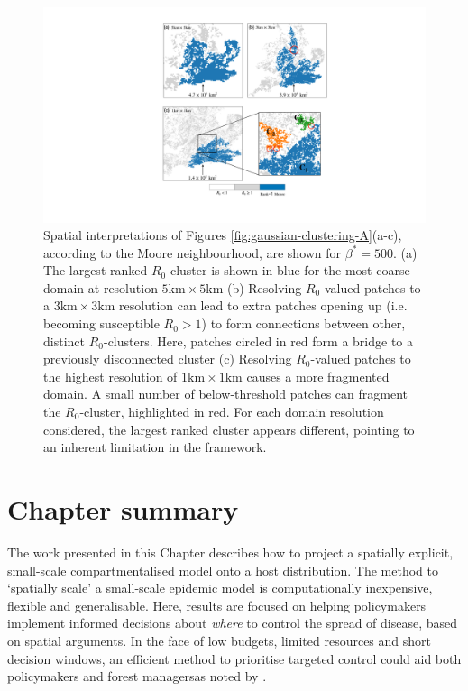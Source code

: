 \begin{figure}
    \centering
    \includegraphics[scale=0.55]{chapter6/figures/fig6B-ga-cluster-distribution.pdf}
    \caption{ 
     Spatial interpretations of Figures \ref{fig:gaussian-clustering-A}(a-c), according to the Moore neighbourhood, are shown for $\beta^*=500$. 
    (a) The largest ranked $R_0$-cluster is shown in blue for the most coarse domain at resolution $\mathrm{5km \times 5km}$ 
    (b) Resolving $R_0$-valued patches to a $\mathrm{3km \times 3km}$ resolution can lead to extra patches opening up 
    (i.e. becoming susceptible $R_0 > 1$) to form connections between other, distinct $R_0$-clusters. 
    Here, patches circled in red form a bridge to a previously disconnected cluster 
    (c) Resolving $R_0$-valued patches to the highest resolution of $\mathrm{1km \times 1km}$ causes a more fragmented domain. 
    A small number of below-threshold patches can fragment the $R_0$-cluster, highlighted in red.
    For each domain resolution considered, the largest ranked cluster appears different, pointing to an inherent limitation in the framework.
    }
    \label{fig:gaussian-clustering-B}
\end{figure}

\section{Chapter summary}

The work presented in this Chapter describes how to project a spatially explicit, small-scale compartmentalised model onto a host distribution.
The method to `spatially scale' a small-scale epidemic model is computationally inexpensive, flexible and generalisable.
Here, results are focused on helping policymakers implement informed decisions about \textit{where} to control the spread of disease, based on spatial arguments.
In the face of low budgets, limited resources and short decision windows, an efficient method to prioritise targeted control could aid both policymakers and forest managers\textemdash as noted by \cite{13-challenges, time-varying-infectivity}.

